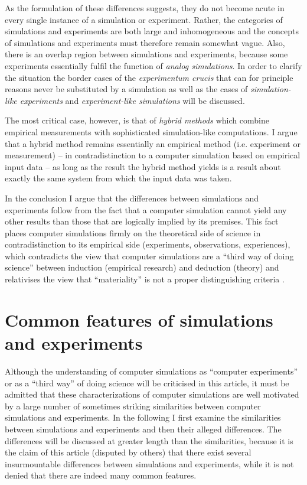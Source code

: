 \documentclass[onecollarge]{STJour}
\numberwithin{equation}{section}
\begin{document}
As the formulation of these differences suggests, they do not become acute in every single instance of a simulation or experiment. Rather, the categories of simulations and experiments are both large and inhomogeneous and the concepts of simulations and experiments must therefore remain somewhat vague. Also, there is an overlap region between simulations and experiments, because some experiments essentially fulfil the function of \emph{analog simulations}.  In order to clarify the situation the border cases of the \emph{experimentum crucis} that can for principle reasons never be substituted by a simulation as well as the cases of \emph{simulation-like experiments} and \emph{experiment-like simulations} will be discussed. 

 The most critical case, however, is that of \emph{hybrid methods} which combine empirical measurements with sophisticated simulation-like computations. I argue that a hybrid method remains essentially an empirical method (i.e. experiment or measurement) -- in contradistinction to a computer simulation based on empirical input data -- as long as the result the hybrid method yields is a result about exactly the same system from which the input data was taken. 

In the conclusion I argue that the differences between simulations and experiments follow from the fact that a computer simulation cannot yield any other results than those that are logically implied by its premises. This fact places computer simulations firmly on the theoretical side of science in contradistinction to its empirical side (experiments, observations, experiences), which contradicts the view that computer simulations are a ``third way of doing science'' \citep[p. 90]{axelrod:2003} between induction (empirical research) and deduction (theory) and relativises the view that ``materiality'' is not a proper distinguishing criteria \citep{parker:2009}.

\section{Common features of simulations and experiments}
\label{commonFeatures}
Although the understanding of computer simulations as ``computer experiments'' \citep{gramelsberger:2010} or as a ``third way'' of doing science will be criticised in this article, it must be admitted that these characterizations of computer simulations are well motivated by a large number of sometimes striking similarities between computer simulations and experiments. In the following I first examine the similarities between simulations and experiments and then their alleged differences. The differences will be discussed at greater length than the similarities, because it is the claim of this article (disputed by others) that there exist several insurmountable differences between simulations and experiments, while it is not denied that there are indeed many common features.
\end{document}
